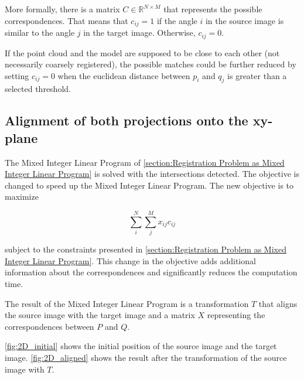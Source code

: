             More formally, there is a matrix $C \in \mathbb{R}^{N \times M}$ that represents the possible correspondences.
            That means that $c_{ij} = 1$ if the angle $i$ in the source image is similar to the angle $j$ in the target image.
            Otherwise, $c_{ij} = 0$.

            If the point cloud and the model are supposed to be close to each other (not necessarily coarsely registered),
            the possible matches could be further reduced by setting $c_{ij} = 0$ when the euclidean distance between $p_i$
            and $q_j$ is greater than a selected threshold.

        \subsection{Alignment of both projections onto the xy-plane}
            \label{sub:Alignment of both projections onto the xy-plane}

            The Mixed Integer Linear Program of \autoref{section:Registration Problem as Mixed Integer Linear Program} is solved with the intersections detected.
            The objective is changed to speed up the Mixed Integer Linear Program. The new objective is to maximize

            \begin{equation}
                \label{eq:objective_angles}
                \sum_{i}^{N} \sum_{j}^{M} x_{ij} c_{ij} 
            \end{equation}    

            subject to the constraints presented in \autoref{section:Registration Problem as Mixed Integer Linear Program}.
            This change in the objective adds additional information about the correspondences and significantly reduces the computation time.

            The result of the Mixed Integer Linear Program is a transformation $T$ that aligns the source image with the target image
            and a matrix $X$ representing the correspondences between $P$ and $Q$.

            \autoref{fig:2D_initial} shows the initial position of the source image and the target image.
            \autoref{fig:2D_aligned} shows the result after the transformation of the source image with $T$.

